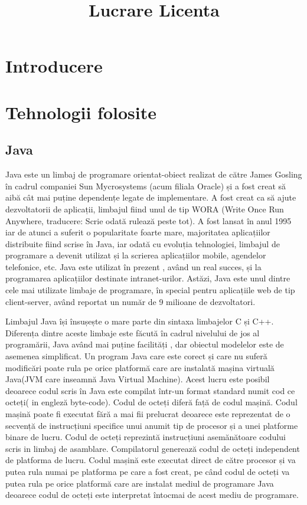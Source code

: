 \documentclass[12pt]{book}
\begin{document}
	
\title{Lucrare Licenta}
\maketitle
	
\chapter{Introducere}
\chapter{Tehnologii folosite}
\section{Java}
	
Java este un limbaj de programare orientat-obiect realizat de către James Gosling în cadrul companiei Sun Mycrosystems (acum filiala Oracle) și a fost creat să aibă cât mai puține dependențe legate de implementare. A fost creat ca să ajute dezvoltatorii de aplicații, limbajul fiind unul de tip WORA (Write Once Run Anywhere, traducere: Scrie odată rulează peste tot).  A fost lansat în anul 1995 iar de atunci a suferit o popularitate foarte mare, majoritatea aplicațiilor distribuite fiind scrise în Java, iar odată cu evoluția tehnologiei, limbajul de programare a devenit utilizat și la scrierea aplicațiilor mobile, agendelor telefonice, etc. Java este utilizat în prezent , având un real succes, și la programarea aplicațiilor destinate intranet-urilor. Astăzi, Java este unul dintre cele mai utilizate limbaje de programare, în special pentru aplicațiile web de tip client-server, având reportat un număr de 9 milioane de dezvoltatori.
	
Limbajul Java își însușește o mare parte din sintaxa limbajelor C și C++. Diferența dintre aceste limbaje este făcută în cadrul nivelului de jos al programării, Java având mai puține facilități , dar obiectul modelelor este de asemenea simplificat. Un program Java care este corect și care nu suferă modificări poate rula pe orice platformă care are instalată mașina virtuală Java(JVM care inseamnă Java Virtual Machine). Acest lucru este posibil deoarece codul scris în Java este compilat într-un format standard numit cod ce octeți( in engleză byte-code). Codul de octeți diferă față de codul mașină. Codul mașină poate fi executat fără a mai fii prelucrat deoarece este reprezentat de o secvență de instrucțiuni specifice unui anumit tip de procesor și a unei platforme binare de lucru. Codul de octeți reprezintă instrucțiuni asemănătoare codului scris in limbaj de asamblare. Compilatorul generează codul de octeți independent de platforma de lucru. Codul mașină este executat direct de către procesor și va putea rula numai pe platforma pe care a fost creat, pe când codul de octeți va putea rula pe orice platformă care are instalat mediul de programare Java deoarece codul de octeți este interpretat întocmai de acest mediu de programare. 
\end{document}
